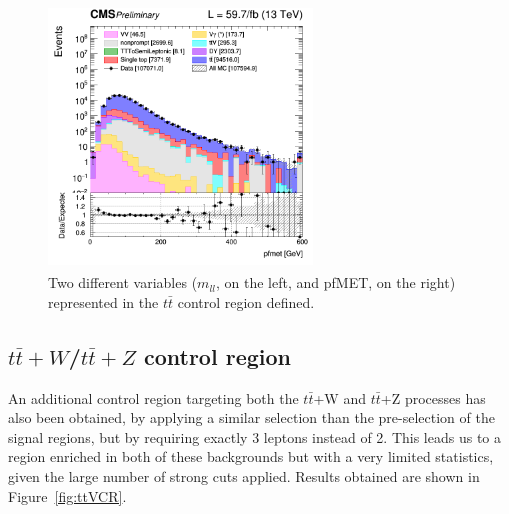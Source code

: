 \documentclass[a4paper, 10pt, openright]{report}
\begin{document}
\begin{figure}[htbp]
{\begin{minipage}[b]{.48\textwidth}
\includegraphics[width=7cm, height=7cm]{figs/log_cratio_ttbarCR_ll_METcorrected_pt_2018.png}
\end{minipage} \hfill
}
\caption{Two different variables ($m_{ll}$, on the left, and pf\ac{MET}, on the right) represented in the $t \bar t$ control region defined.}
\label{fig:TopCR}
\end{figure}

\subsection{$t \bar t + W$/$t \bar t + Z$ control region} \label{section:ttVCR}

An additional control region targeting both the $t \bar t$+W and $t \bar t$+Z processes has also been obtained, by applying a similar selection than the pre-selection of the signal regions, but by requiring exactly 3 leptons instead of 2. This leads us to a region enriched in both of these backgrounds but with a very limited statistics, given the large number of strong cuts applied. Results obtained are shown in Figure~\ref{fig:ttVCR}.
\end{document}
